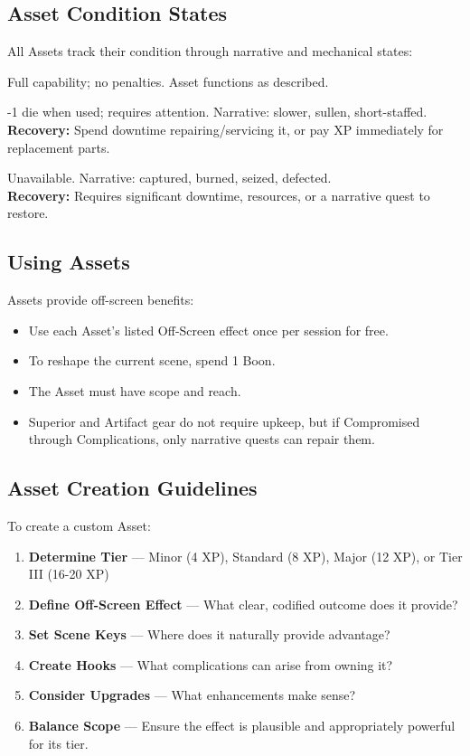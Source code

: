 \documentclass[12pt]{article}
\begin{document}
\subsection*{Asset Condition States}

All Assets track their condition through narrative and mechanical states:

\begin{description}[leftmargin=*]
  \item[\textbf{Maintained}] Full capability; no penalties. Asset functions as described.

  \item[\textbf{Neglected}] -1 die when used; requires attention. Narrative: slower, sullen, short-staffed. \\
  \textbf{Recovery:} Spend downtime repairing/servicing it, or pay XP immediately for replacement parts.

  \item[\textbf{Compromised}] Unavailable. Narrative: captured, burned, seized, defected. \\
  \textbf{Recovery:} Requires significant downtime, resources, or a narrative quest to restore.
\end{description}

\subsection*{Using Assets}

Assets provide off-screen benefits:
\begin{itemize}
  \item Use each Asset's listed Off-Screen effect once per session for free.
  \item To reshape the current scene, spend 1 Boon.
  \item The Asset must have scope and reach.
  \item Superior and Artifact gear do not require upkeep, but if Compromised through Complications, only narrative quests can repair them.
\end{itemize}

\subsection*{Asset Creation Guidelines}

To create a custom Asset:
\begin{enumerate}
  \item \textbf{Determine Tier} --- Minor (4 XP), Standard (8 XP), Major (12 XP), or Tier III (16-20 XP)
  \item \textbf{Define Off-Screen Effect} --- What clear, codified outcome does it provide?
  \item \textbf{Set Scene Keys} --- Where does it naturally provide advantage?
  \item \textbf{Create Hooks} --- What complications can arise from owning it?
  \item \textbf{Consider Upgrades} --- What enhancements make sense?
  \item \textbf{Balance Scope} --- Ensure the effect is plausible and appropriately powerful for its tier.
\end{enumerate}
\end{document}
